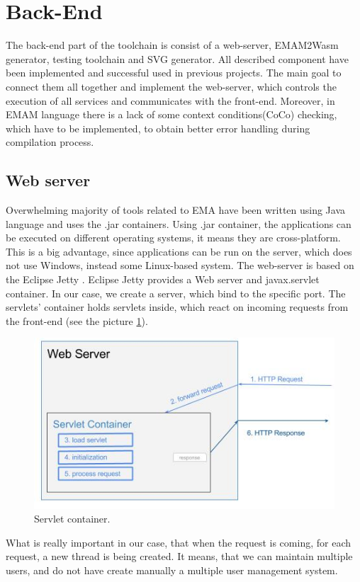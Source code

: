 \section{Back-End}
The back-end part of the toolchain is consist of a web-server, EMAM2Wasm generator, testing toolchain and SVG generator. All described component have been implemented and successful used in previous projects. The main goal to connect them all together and implement the web-server, which controls the execution of all services and communicates with the front-end. Moreover, in EMAM language there is a lack of some context conditions(CoCo) checking, which have to be implemented, to obtain better error handling during compilation process.
\subsection{Web server}
Overwhelming majority of tools related to EMA have been written using Java language and uses the .jar containers. Using .jar container, the applications can be executed on different operating systems, it means they are cross-platform. This is a big advantage, since applications can be run on the server, which does not use Windows, instead some Linux-based system. The web-server is based on the Eclipse Jetty \cite{Jetty}. Eclipse Jetty provides a Web server and javax.servlet container. In our case, we create a server, which bind to the specific port. The servlets' container holds servlets inside, which react on incoming requests from the front-end (see the picture \ref{fig:servlet}). \newline
\begin{figure}[h!]
    \centering
    \includegraphics[width=0.6\linewidth]{src/pic/servlet-container-life-cycle}
    \caption{Servlet container.}
    \label{fig:servlet}
\end{figure} \newline
What is really important in our case, that when the request is coming, for each request, a new thread is being created. It means, that we can maintain multiple users, and do not have create manually a multiple user management system. \newline
